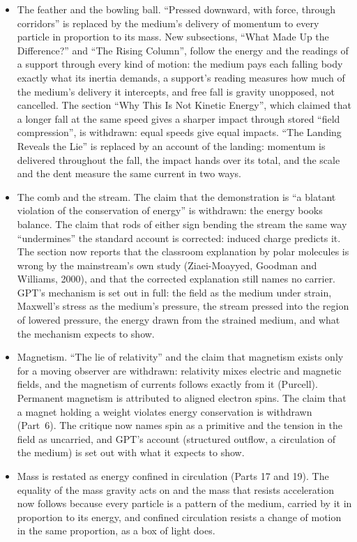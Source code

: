 \begin{itemize}
  \item The feather and the bowling ball. ``Pressed downward, with force, through corridors'' is replaced by the medium's delivery of momentum to every particle in proportion to its mass. New subsections, ``What Made Up the Difference?'' and ``The Rising Column'', follow the energy and the readings of a support through every kind of motion: the medium pays each falling body exactly what its inertia demands, a support's reading measures how much of the medium's delivery it intercepts, and free fall is gravity unopposed, not cancelled. The section ``Why This Is Not Kinetic Energy'', which claimed that a longer fall at the same speed gives a sharper impact through stored ``field compression'', is withdrawn: equal speeds give equal impacts. ``The Landing Reveals the Lie'' is replaced by an account of the landing: momentum is delivered throughout the fall, the impact hands over its total, and the scale and the dent measure the same current in two ways.
  \item The comb and the stream. The claim that the demonstration is ``a blatant violation of the conservation of energy'' is withdrawn: the energy books balance. The claim that rods of either sign bending the stream the same way ``undermines'' the standard account is corrected: induced charge predicts it. The section now reports that the classroom explanation by polar molecules is wrong by the mainstream's own study (Ziaei-Moayyed, Goodman and Williams, 2000), and that the corrected explanation still names no carrier. GPT's mechanism is set out in full: the field as the medium under strain, Maxwell's stress as the medium's pressure, the stream pressed into the region of lowered pressure, the energy drawn from the strained medium, and what the mechanism expects to show.
  \item Magnetism. ``The lie of relativity'' and the claim that magnetism exists only for a moving observer are withdrawn: relativity mixes electric and magnetic fields, and the magnetism of currents follows exactly from it (Purcell). Permanent magnetism is attributed to aligned electron spins. The claim that a magnet holding a weight violates energy conservation is withdrawn (Part~6). The critique now names spin as a primitive and the tension in the field as uncarried, and GPT's account (structured outflow, a circulation of the medium) is set out with what it expects to show.
  \item Mass is restated as energy confined in circulation (Parts 17 and 19). The equality of the mass gravity acts on and the mass that resists acceleration now follows because every particle is a pattern of the medium, carried by it in proportion to its energy, and confined circulation resists a change of motion in the same proportion, as a box of light does.

\end{itemize}
